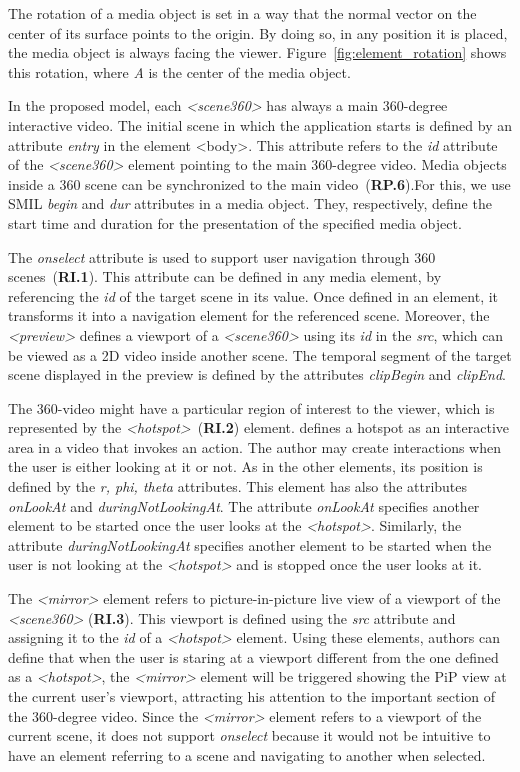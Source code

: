 The rotation of a media object is set in a way that the normal vector on the center of its surface points to the origin. By doing so, in any position it is placed, the media object is always facing the viewer. Figure~\ref{fig:element_rotation} shows this rotation, where \emph{A} is the center of the media object.

In the proposed model, each \emph{<scene360>} has always a main 360-degree interactive video. The initial scene in which the application starts is defined by an attribute \emph{entry} in the element <body>. This attribute refers to the \emph{id} attribute of the \emph{<scene360>} element pointing to the main 360-degree video. Media objects inside a 360 scene can be synchronized to the main video~(\textbf{RP.6}).For this, we use SMIL \emph{begin} and \emph{dur} attributes in a media object. They, respectively, define the start time and duration for the presentation of the specified media object.

The \emph{onselect} attribute is used to support user navigation through 360 scenes~(\textbf{RI.1}). This attribute can be defined in any media element, by referencing the \emph{id} of the target scene in its value. Once defined in an element, it transforms it into a navigation element for the referenced scene. Moreover, the \emph{<preview>} defines a viewport of a \emph{<scene360>} using its \emph{id} in the \emph{src}, which can be viewed as a 2D video inside another scene. The temporal segment of the target scene displayed in the preview is defined by the attributes \emph{clipBegin} and \emph{clipEnd}. 

The 360-video might have a particular region of interest to the viewer, which is represented by the \emph{<hotspot>}~(\textbf{RI.2}) element. \cite{Britta2017} defines a hotspot as an interactive area in a video that invokes an action. The author may create interactions when the user is either looking at it or not. As in the other elements, its position is defined by the \emph{r, phi, theta} attributes. This element has also the attributes \emph{onLookAt} and \emph{duringNotLookingAt}. The attribute \emph{onLookAt} specifies another element to be started once the user looks at the \emph{<hotspot>}. Similarly, the attribute \emph{duringNotLookingAt} specifies another element to be started when the user is not looking at the \emph{<hotspot>} and is stopped once the user looks at it.

The \emph{<mirror>} element refers to picture-in-picture live view of a viewport of the \emph{<scene360>} (\textbf{RI.3}). This viewport is defined using the \emph{src} attribute and assigning it to the \emph{id} of a \emph{<hotspot>} element. Using these elements, authors can define that when the user is staring at a viewport different from the one defined as a \emph{<hotspot>}, the \emph{<mirror>} element will be triggered showing the PiP view at the current user's viewport, attracting his attention to the important section of the 360-degree video. Since the \emph{<mirror>} element refers to a viewport of the current scene, it does not support \emph{onselect} because it would not be intuitive to have an element referring to a scene and navigating to another when selected.



